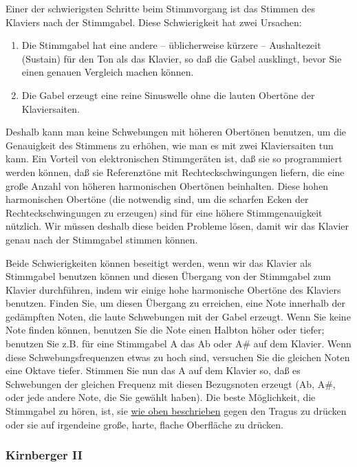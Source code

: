 Einer der schwierigsten Schritte beim Stimmvorgang ist das Stimmen des Klaviers nach der Stimmgabel.
Diese Schwierigkeit hat zwei Ursachen:

\begin{enumerate}[label={\arabic*.}] 
 \item Die Stimmgabel hat eine andere -- üblicherweise kürzere -- Aushaltezeit (Sustain) für den Ton als das
 Klavier, so daß die Gabel ausklingt, bevor Sie einen genauen Vergleich machen können.
 \item Die Gabel erzeugt eine reine Sinuswelle ohne die lauten Obertöne der Klaviersaiten.
\end{enumerate}

Deshalb kann man keine Schwebungen mit höheren Obertönen benutzen, um die Genauigkeit des Stimmens zu erhöhen, wie man es mit zwei Klaviersaiten tun kann.
Ein Vorteil von elektronischen Stimmgeräten ist, daß sie so programmiert werden können, daß sie Referenztöne mit Rechteckschwingungen liefern, die eine große Anzahl von höheren harmonischen Obertönen beinhalten.
Diese hohen harmonischen Obertöne (die notwendig sind, um die scharfen Ecken der Rechteckschwingungen zu erzeugen) sind für eine höhere Stimmgenauigkeit nützlich.
Wir müssen deshalb diese beiden Probleme lösen, damit wir das Klavier genau nach der Stimmgabel stimmen können.

Beide Schwierigkeiten können beseitigt werden, wenn wir das Klavier als Stimmgabel benutzen können und diesen Übergang von der Stimmgabel zum Klavier durchführen, indem wir einige hohe harmonische Obertöne des Klaviers benutzen.
Finden Sie, um diesen Übergang zu erreichen, eine Note innerhalb der gedämpften Noten, die laute Schwebungen mit der Gabel erzeugt.
Wenn Sie keine Note finden können, benutzen Sie die Note einen Halbton höher oder tiefer; benutzen Sie z.B. für eine Stimmgabel A das Ab oder A\# auf dem Klavier.
Wenn diese Schwebungsfrequenzen etwas zu hoch sind, versuchen Sie die gleichen Noten eine Oktave tiefer.
Stimmen Sie nun das A auf dem Klavier so, daß es Schwebungen der gleichen Frequenz mit diesen Bezugsnoten erzeugt (Ab, A\#, oder jede andere Note, die Sie gewählt haben).
Die beste Möglichkeit, die Stimmgabel zu hören, ist, sie \hyperref[c2_3_gabel]{wie oben beschrieben} gegen den Tragus zu drücken oder sie auf irgendeine große, harte, flache Oberfläche zu drücken.
 

\label{c2_6c}
\subsubsection{Kirnberger II}
\label{c2_6_kirn}

